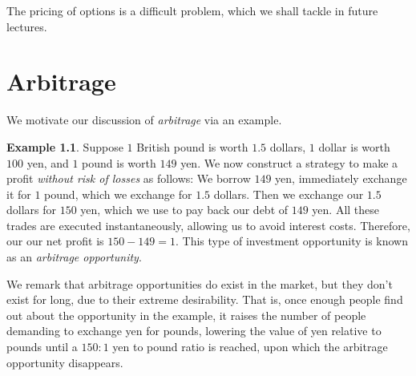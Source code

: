 \documentclass[12pt]{amsbook}
\theoremstyle{plain}
\theoremstyle{definition}
\newtheorem*{example}{Example}
\theoremstyle{remark}
\numberwithin{equation}{section}  %
\begin{document}
	The pricing of options is a difficult problem, which we shall tackle in future 
	lectures.\chapter{Arbitrage}
	We motivate our discussion of \emph{arbitrage} via an example. 
	\begin{example}
		Suppose $1$ British pound is worth $1.5$ dollars,  $1$ dollar is worth 
		$100$ yen, 
		and $1$ pound is worth $149$ yen.
		We now construct a strategy to make a profit \emph{without risk of losses} 
		as follows: 
		We borrow $149$ yen, immediately exchange it for $1$ pound, which we 
		exchange for $1.5$ dollars. Then we exchange our $1.5$ dollars for $150$ 
		yen, which we use to pay back our debt of $149$ yen. All these trades are 
		executed instantaneously, allowing us to avoid interest costs. Therefore, 
		our 
		our net profit is $150 - 149 = 1$. This type of investment opportunity is 
		known as an
		\emph{arbitrage opportunity}.
	\end{example}
	We remark that arbitrage opportunities do exist in the market, but they don't 
	exist for long, due to their extreme desirability. That is, once enough people 
	find out about the opportunity in the example, it raises the number of people 
	demanding to exchange yen for pounds, lowering the value of yen relative to 
	pounds until a $150:1$ yen to pound ratio is reached, upon which the arbitrage 
	opportunity disappears.  
\end{document}
